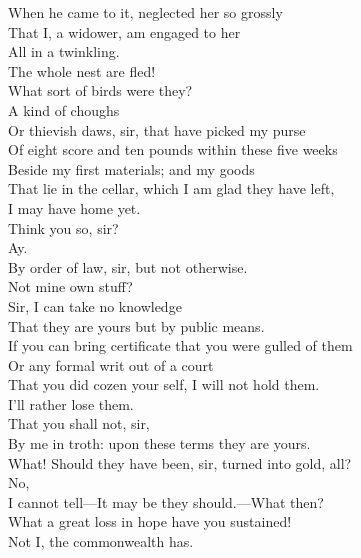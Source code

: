 \documentclass[a4paper,oneside,12pt]{memoir}
\begin{document}
\begin{drama*}
When he came to it, neglected her so grossly\\
That I, a widower, am engaged to her\\
All in a twinkling.\\
\mammonspeaks {} The whole nest are fled!\\
\lovewitspeaks What sort of birds were they?\\
\mammonspeaks {} A kind of choughs\\
Or thievish daws, sir, that have picked my purse\\
Of eight score and ten pounds within these five weeks\\
Beside my first materials; and my goods\\
That lie in the cellar, which I am glad they have left,\\
I may have home yet.\\
\lovewitspeaks {} Think you so, sir?\\
\mammonspeaks {} Ay.\\
\lovewitspeaks By order of law, sir, but not otherwise.\\
\mammonspeaks Not mine own stuff?\\
\lovewitspeaks {} Sir, I can take no knowledge\\
That they are yours but by public means.\\
If you can bring certificate that you were gulled of them\\
Or any formal writ out of a court\\
That you did cozen your self, I will not hold them.\\
\mammonspeaks I'll rather lose them.\\
\lovewitspeaks {} That you shall not, sir,\\
By me in troth: upon these terms they are yours.\\
What! Should they have been, sir, turned into gold, all?\\
\mammonspeaks {} No,\\
I cannot tell---It may be they should.---What then?\\
\lovewitspeaks What a great loss in hope have you sustained!\\
\mammonspeaks Not I, the commonwealth has.\\

\end{drama*}
\end{document}
